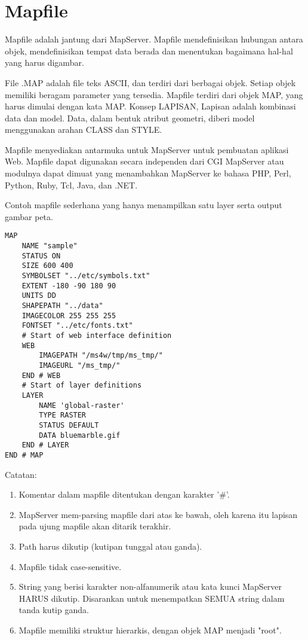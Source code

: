 \section{Mapfile}
Mapfile adalah jantung dari MapServer. Mapfile mendefinisikan hubungan antara objek, mendefinisikan tempat data berada dan menentukan bagaimana hal-hal yang harus digambar. 

File .MAP adalah file teks ASCII, dan terdiri dari berbagai objek. Setiap objek memiliki beragam parameter yang tersedia. Mapfile terdiri dari objek MAP, yang harus dimulai dengan kata MAP. Konsep LAPISAN, Lapisan adalah kombinasi data dan model. Data, dalam bentuk atribut geometri, diberi model menggunakan arahan CLASS dan STYLE.

Mapfile menyediakan antarmuka untuk MapServer untuk pembuatan aplikasi Web. Mapfile dapat digunakan secara independen dari CGI MapServer atau modulnya dapat dimuat yang menambahkan MapServer ke bahasa PHP, Perl, Python, Ruby, Tcl, Java, dan .NET.

Contoh mapfile sederhana yang hanya menampilkan satu layer serta output gambar peta.
\begin{lstlisting}
MAP
    NAME "sample"
    STATUS ON
    SIZE 600 400
    SYMBOLSET "../etc/symbols.txt"
    EXTENT -180 -90 180 90
    UNITS DD
    SHAPEPATH "../data"
    IMAGECOLOR 255 255 255
    FONTSET "../etc/fonts.txt"
    # Start of web interface definition
    WEB
        IMAGEPATH "/ms4w/tmp/ms_tmp/"
        IMAGEURL "/ms_tmp/"
    END # WEB
    # Start of layer definitions
    LAYER
        NAME 'global-raster'
        TYPE RASTER
        STATUS DEFAULT
        DATA bluemarble.gif
    END # LAYER
END # MAP
\end{lstlisting}

Catatan:
\begin{enumerate}
\item Komentar dalam mapfile ditentukan dengan karakter '\#'.
\item MapServer mem-parsing mapfile dari atas ke bawah, oleh karena itu lapisan pada ujung mapfile akan ditarik terakhir.
\item Path harus dikutip (kutipan tunggal atau ganda).
\item Mapfile tidak case-sensitive.
\item String yang berisi karakter non-alfanumerik atau kata kunci MapServer HARUS dikutip. Disarankan untuk menempatkan SEMUA string dalam tanda kutip ganda.
\item Mapfile memiliki struktur hierarkis, dengan objek MAP menjadi "root".
\end{enumerate}